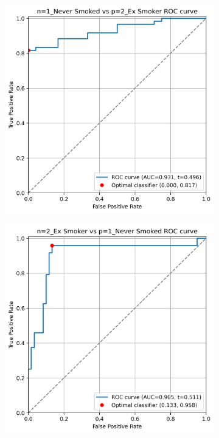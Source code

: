 \documentclass[draft]{article} %
\begin{document}
\begin{figure}[p]
    \begin{subfigure}{0.46\linewidth}
        \centering
        \includegraphics[width=\linewidth]{cohort1/test_1v2_roc.png}
    \end{subfigure}
    \hspace{4mm}
    \begin{subfigure}{0.46\linewidth}
        \centering
        \includegraphics[width=\linewidth]{cohort1/test_2v1_roc.png}

\end{subfigure}
\end{figure}
\end{document}
